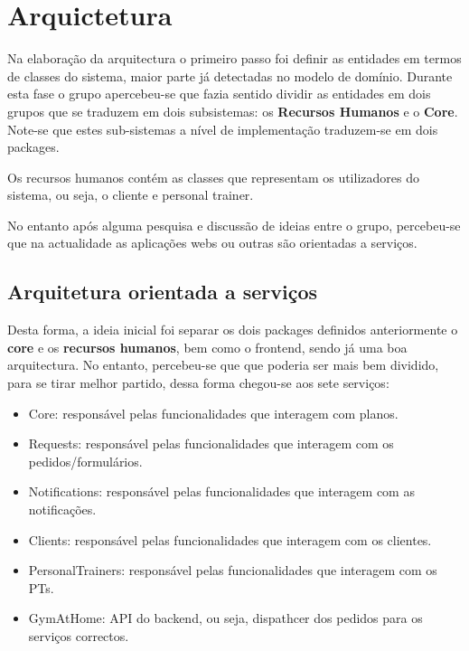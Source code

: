 \chapter{Arquictetura}
\label{chap:arquitetura}

\hspace{5mm} Na elaboração da arquitectura o primeiro passo foi definir as entidades em termos de classes do sistema, maior parte já detectadas no modelo de domínio. Durante esta fase o grupo apercebeu-se que fazia sentido dividir as entidades em dois grupos que se traduzem em dois subsistemas: os \textbf{Recursos Humanos} e o \textbf{Core}. Note-se que estes sub-sistemas a nível de implementação traduzem-se em dois packages.

\hspace{5mm} Os recursos humanos contém as classes que representam os utilizadores do sistema, ou seja, o cliente e personal trainer.

\hspace{5mm} No entanto após alguma pesquisa e discussão de ideias entre o grupo, percebeu-se que na actualidade as aplicações webs ou outras são orientadas a serviços.

\section{Arquitetura orientada a serviços}

\hspace{5mm} Desta forma, a ideia inicial foi separar os dois packages definidos anteriormente o \textbf{core} e os \textbf{recursos humanos}, bem como o frontend, sendo já uma boa arquitectura. No entanto, percebeu-se que que poderia ser mais bem dividido, para se tirar melhor partido, dessa forma chegou-se aos sete serviços:

\begin{itemize}
    \item Core: responsável pelas funcionalidades que interagem com planos.
    \item Requests: responsável pelas funcionalidades que interagem com os pedidos/formulários.
    \item Notifications: responsável pelas funcionalidades que interagem com as notificações.
    \item Clients: responsável pelas funcionalidades que interagem com os clientes.
    \item PersonalTrainers: responsável pelas funcionalidades que interagem com os PTs.
    \item GymAtHome: API do backend, ou seja, dispathcer dos pedidos para os serviços correctos.
\end{itemize}

